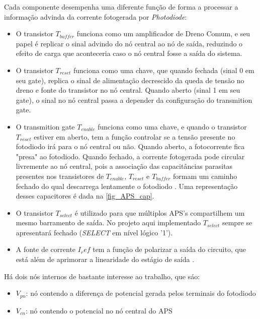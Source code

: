 Cada componente desempenha uma diferente fun{\c c}\~ao de forma a processar a informação advinda da corrente fotogerada por \emph{Photodiode}:

\begin{itemize}

    \item O transistor \emph{$T_{buffer}$} funciona como um amplificador de Dreno Comum, e seu papel \'e replicar o sinal advindo do n\'o central ao n\'o de sa\'ida, reduzindo o efeito de carga que aconteceria caso o n\'o central fosse a saída do sistema.

    \item O transistor \emph{$T_{reset}$} funciona como uma chave, que quando fechada (sinal 0 em seu gate), replica o sinal de alimentação decrescido da queda de tensão no dreno e fonte do transistor no n\'o central. Quando aberto (sinal 1 em seu gate), o sinal no n\'o central passa a depender da configuração do transmition gate.

    \item O transmition gate \emph{$T_{enable}$} funciona como uma chave, e quando o transistor \emph{$T_{reset}$} estiver em aberto, tem a função controlar se a tensão presente no fotodiodo ir\'a para o nó central ou n\~ao. Quando aberto, a fotocorrente fica "presa" ao fotodiodo. Quando fechado, a corrente fotogerada pode circular livremente ao n\'o central, pois a associação das capacitâncias parasitas presentes nos transistores de \emph{$T_{enable}$}, \emph{$T_{reset}$} e \emph{$T_{buffer}$} formam um caminho fechado do qual descarrega lentamente o fotodiodo \cite{LidianeCampos}. Uma representa{\c c}\~ao desses capacitores \'e dada na \autoref{fig_APS_cap}.
    
    \item O transistor \emph{$T_{select}$} \'e utilizado para que m\'ultiplos APS's compartilhem um mesmo barramento de sa\'ida. No projeto aqui implementado \emph{$T_{select}$} sempre se apresentar\'a fechado (\emph{SELECT} em n\'ivel l\'ogico '1').
    
    \item A fonte de corrente \emph{$I_ref$} tem a fun{\c c}\~ao de polarizar a sa\'ida do circuito, que está além de aprimorar a linearidade do estágio de sa\'ida \cite{RazaviFundM}.

\end{itemize}

    H\'a dois n\'os internos de bastante interesse ao trabalho, que s\'ao:

\begin{itemize}
    \item \emph{$V_{pn}$}: n\'o contendo a diferen{\c c}a de potencial gerada pelos terminais do fotodiodo
    \item \emph{$V_{cn}$}: n\'o contendo o potencial no n\'o central do APS
\end{itemize}

